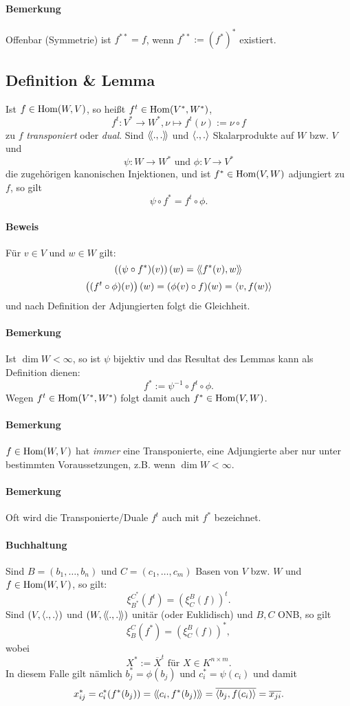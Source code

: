 \paragraph{Bemerkung}
	Offenbar (Symmetrie) ist $ f^{**} = f $, wenn $ f^{**} := (f^*)^* $ existiert.

\subsection{Definition \& Lemma}
\begin{Definition}
	Ist $ f\in \operatorname{Hom}(W,V) $, so heißt $ f^t\in \operatorname{Hom}(V^*,W^*) $,
		\[ f^t:V^*\to W^*,\nu\mapsto f^t(\nu):= \nu\circ f \]
	zu $ f $ \emph{transponiert} oder \emph{dual}. Sind $ \langle\! \langle .,. \rangle\! \rangle $ und $ \langle .,. \rangle $ Skalarprodukte auf $ W $ bzw. $ V $ und
		\[ \psi:W\to W^*\text{ und }\phi:V\to V^* \]
	die zugehörigen kanonischen Injektionen, und ist $ f^*\in \operatorname{Hom}(V,W) $ adjungiert zu $ f $, so gilt
		\[ \psi \circ f^* = f^t\circ \phi. \]
\end{Definition}
\paragraph{Beweis}
	Für $ v\in V $ und $ w\in W $ gilt:
		\[ \left((\psi\circ f^*)(v)\right)(w) = \langle\! \langle f^*(v),w \rangle\! \rangle \]
		\[ \left((f^t\circ \phi)(v)\right)(w) = (\phi(v)\circ f)(w) = \langle v,f(w) \rangle \]
	und nach Definition der Adjungierten folgt die Gleichheit.
\paragraph{Bemerkung}
	Ist $ \dim W<\infty $, so ist $ \psi $ bijektiv und das Resultat des Lemmas kann als Definition dienen:
		\[ f^* := \psi^{-1}\circ f^t\circ \phi. \]
	Wegen $ f^t\in \operatorname{Hom}(V^*,W^*) $ folgt damit auch $ f^*\in \operatorname{Hom}(V,W) $.
\paragraph{Bemerkung}
	$ f\in \operatorname{Hom}(W,V) $ hat \emph{immer} eine Transponierte, eine Adjungierte aber nur unter bestimmten Voraussetzungen, z.B. wenn $ \dim W < \infty $.
\paragraph{Bemerkung}
	Oft wird die Transponierte/Duale $ f^t $ auch mit $ f^* $ bezeichnet.
\paragraph{Buchhaltung}
	Sind $ B=(b_1,\dots,b_n) $ und $ C=(c_1,\dots,c_m) $ Basen von $ V $ bzw. $ W $ und $ f\in \operatorname{Hom}(W,V) $, so gilt:
		\[ \xi_{B^*}^{C^*}(f^t) = \left(\xi_C^B(f)\right)^t. \]
	Sind $ (V,\langle .,. \rangle) $ und $ (W,\langle\! \langle .,. \rangle\! \rangle) $ unitär (oder Euklidisch) und $ B, C $ ONB, so gilt
		\[ \xi_B^C(f^*) = \left(\xi_C^B(f)\right)^*, \]
	wobei 
		\[ X^*:= \overline{X}^t \text{ für } X\in K^{n\times m}. \]
	In diesem Falle gilt nämlich $ b_j^*=\phi(b_j) $ und $ c_i^* = \psi(c_i) $ und damit
		\[ x_{ij}^* = c_i^*(f^*(b_j)) = \langle\! \langle c_i,f^*(b_j) \rangle\! \rangle = \overline{\langle b_j,f(c_i) \rangle} = \overline{x_{ji}}. \]
